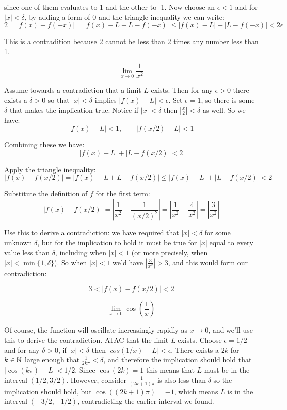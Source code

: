\documentclass{article}
\begin{document}
since one of them evaluates to 1 and the other to -1. Now choose an $\epsilon < 1$ and for $|x| < \delta$, by adding a form of 0 and the triangle inequality we can write:
$$2 = |f(x) - f(-x)| = |f(x) - L + L - f(-x)| \leq |f(x) - L| + |L - f(-x)| < 2\epsilon$$

This is a contradition because 2 cannot be less than 2 times any number less than 1.

\begin{problem}
$$\lim\limits_{x \to 0} \frac{1}{x^2}$$
\end{problem}

Assume towards a contradiction that a limit $L$ exists. Then for any $\epsilon > 0$ there exists a $\delta > 0$ so that $|x| < \delta$ implies $|f(x) - L| < \epsilon$. Set $\epsilon = 1$, so there is some $\delta$ that makes the implication true. Notice if $|x| < \delta $ then $|\frac{x}{2}| < \delta $ as well. So we have:
$$|f(x) - L| < 1, \qquad |f(x/2) - L| < 1$$

Combining these we have:
$$|f(x) - L| + |L - f(x/2)| < 2$$

Apply the triangle inequality:
$$|f(x) - f(x/2)| = |f(x) - L + L - f(x/2)| \leq |f(x) - L| + |L - f(x/2)| < 2$$

Substitute the definition of $f$ for the first term:
$$|f(x) - f(x/2)| = \left|\frac{1}{x^2} - \frac{1}{\left(x/2\right)^2}\right| = \left|\frac{1}{x^2} - \frac{4}{x^2}\right| = \left|\frac{3}{x^2}\right|$$

Use this to derive a contradiction: we have required that $|x| < \delta$ for some unknown $\delta$, but for the implication to hold it must be true for $|x|$ equal to every value less than $\delta$, including when $|x| < 1$ (or more precisely, when $|x| < \min\{1, \delta\}$). So when $|x| < 1$ we'd have $\left|\frac{3}{x^2}\right| > 3$, and this would form our contradiction:

$$3 < |f(x) - f(x/2)| < 2$$

\begin{problem}
$$\lim\limits_{x\to 0} \cos\left(\frac{1}{x}\right)$$
\end{problem}

Of course, the function will oscillate increasingly rapidly as $x \to 0$, and we'll use this to derive the contradiction. ATAC that the limit $L$ exists. Choose $\epsilon = 1/2$ and for any $\delta > 0$, if $|x| < \delta$ then $|cos(1/x) - L| < \epsilon$. There exists a $2k$ for $k \in \mathbb{N}$ large enough that $\frac{1}{2k\pi} < \delta$, and therefore the implication should hold that $|\cos(k \pi) - L| < 1/2$. Since $\cos(2k) = 1$ this means that $L$ must be in the interval $(1/2, 3/2)$. However, consider $\frac{1}{(2k+1)\pi}$ is also less than $\delta$ so the implication should hold, but $\cos((2k + 1)\pi) = -1$, which means $L$ is in the interval $(-3/2, -1/2)$, contradicting the earlier interval we found.
\end{document}
